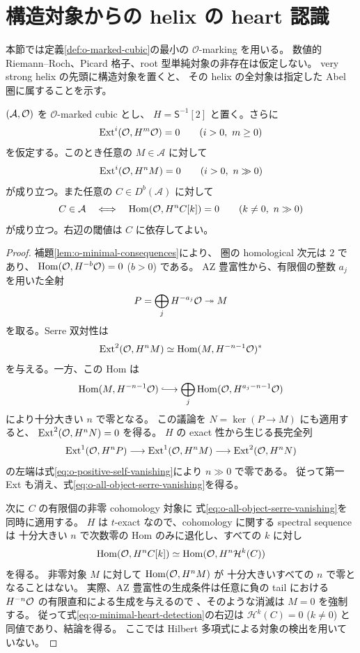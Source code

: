 \section{構造対象からの helix の heart 認識}
\label{sec:o-helix-heart-recognition}

本節では定義\ref{def:o-marked-cubic}の最小の $\mathcal O$-marking を用いる。
数値的 Riemann--Roch、Picard 格子、root 型単純対象の非存在は仮定しない。
very strong helix の先頭に構造対象を置くと、
その helix の全対象は指定した Abel 圏に属することを示す。

\begin{lemma}
\label{lem:o-ample-serre-vanishing}
$(\mathcal A,\mathcal O)$ を $\mathcal O$-marked cubic とし、
$H=\mathsf S^{-1}[2]$ と置く。さらに
\begin{equation}\label{eq:o-positive-self-vanishing}
 \operatorname{Ext}^i(\mathcal O,H^m\mathcal O)=0\qquad(i>0,\ m\ge0)
\end{equation}
を仮定する。このとき任意の $M\in\mathcal A$ に対して
\begin{equation}\label{eq:o-all-object-serre-vanishing}
 \operatorname{Ext}^i(\mathcal O,H^nM)=0\qquad(i>0,\ n\gg0)
\end{equation}
が成り立つ。また任意の $C\in D^b(\mathcal A)$ に対して
\begin{equation}\label{eq:o-minimal-heart-detection}
 C\in\mathcal A\quad\Longleftrightarrow\quad
 \operatorname{Hom}(\mathcal O,H^nC[k])=0\qquad(k\ne0,\ n\gg0)
\end{equation}
が成り立つ。右辺の閾値は $C$ に依存してよい。
\end{lemma}
\begin{proof}
補題\ref{lem:o-minimal-consequences}により、
圏の homological 次元は $2$ であり、
$\operatorname{Hom}(\mathcal O,H^{-b}\mathcal O)=0$ ($b>0$) である。
AZ 豊富性から、有限個の整数 $a_j$ を用いた全射
\[
 P=\bigoplus_jH^{-a_j}\mathcal O\twoheadrightarrow M
\]
を取る。Serre 双対性は
\[
 \operatorname{Ext}^2(\mathcal O,H^nM)
 \simeq\operatorname{Hom}(M,H^{-n-1}\mathcal O)^*
\]
を与える。一方、この Hom は
\[
 \Hom(M,H^{-n-1}\OO)
 \lhook\joinrel\longrightarrow
 \bigoplus_j\Hom(\OO,H^{a_j-n-1}\OO)
\]
により十分大きい $n$ で零となる。
この議論を $N=\ker(P\to M)$ にも適用すると、
$\operatorname{Ext}^2(\mathcal O,H^nN)=0$ を得る。
$H$ の exact 性から生じる長完全列
\[
 \operatorname{Ext}^1(\mathcal O,H^nP)\longrightarrow\operatorname{Ext}^1(\mathcal O,H^nM)
 \longrightarrow\operatorname{Ext}^2(\mathcal O,H^nN)
\]
の左端は式\eqref{eq:o-positive-self-vanishing}により $n\gg0$ で零である。
従って第一 Ext も消え、式\eqref{eq:o-all-object-serre-vanishing}を得る。

次に $C$ の有限個の非零 cohomology 対象に
式\eqref{eq:o-all-object-serre-vanishing}を同時に適用する。
$H$ は $t$-exact なので、cohomology に関する spectral sequence は
十分大きい $n$ で次数零の Hom のみに退化し、すべての $k$ に対し
\[
 \operatorname{Hom}(\mathcal O,H^nC[k])
 \simeq\operatorname{Hom}(\mathcal O,H^n\mathcal H^k(C))
\]
を得る。
非零対象 $M$ に対して $\operatorname{Hom}(\mathcal O,H^nM)$ が
十分大きいすべての $n$ で零となることはない。
実際、AZ 豊富性の生成条件は任意に負の tail における
$H^{-n}\mathcal O$ の有限直和による生成を与えるので
\cite[Lemma 2.1(ii)]{PolishchukProj}、そのような消滅は $M=0$ を強制する。
従って式\eqref{eq:o-minimal-heart-detection}の右辺は
$\mathcal H^k(C)=0$ ($k\ne0$) と同値であり、結論を得る。
ここでは Hilbert 多項式による対象の検出を用いていない。
\end{proof}

